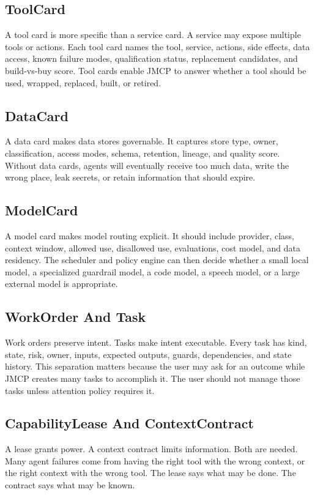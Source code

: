 \documentclass[10pt,journal,onecolumn]{IEEEtran}
\begin{document}
\subsection{ToolCard}
A tool card is more specific than a service card. A service may expose multiple tools or actions. Each tool card names the tool, service, actions, side effects, data access, known failure modes, qualification status, replacement candidates, and build-vs-buy score. Tool cards enable JMCP to answer whether a tool should be used, wrapped, replaced, built, or retired.

\subsection{DataCard}
A data card makes data stores governable. It captures store type, owner, classification, access modes, schema, retention, lineage, and quality score. Without data cards, agents will eventually receive too much data, write the wrong place, leak secrets, or retain information that should expire.

\subsection{ModelCard}
A model card makes model routing explicit. It should include provider, class, context window, allowed use, disallowed use, evaluations, cost model, and data residency. The scheduler and policy engine can then decide whether a small local model, a specialized guardrail model, a code model, a speech model, or a large external model is appropriate.

\subsection{WorkOrder And Task}
Work orders preserve intent. Tasks make intent executable. Every task has kind, state, risk, owner, inputs, expected outputs, guards, dependencies, and state history. This separation matters because the user may ask for an outcome while JMCP creates many tasks to accomplish it. The user should not manage those tasks unless attention policy requires it.

\subsection{CapabilityLease And ContextContract}
A lease grants power. A context contract limits information. Both are needed. Many agent failures come from having the right tool with the wrong context, or the right context with the wrong tool. The lease says what may be done. The contract says what may be known.
\end{document}
